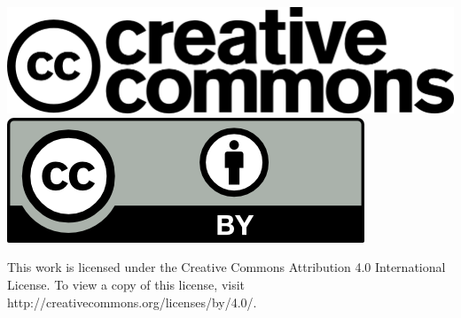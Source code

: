 \documentclass[12pt]{beamer}
\begin{document}
{
\begin{frame}
\includegraphics[scale=0.8]{../reusable_images/cc_logo_arge.png}\hspace{0.5cm} 
\includegraphics[scale=0.95]{../reusable_images/by.png}

\vspace{1cm}
This work is licensed under the Creative Commons Attribution 4.0 International License. To view a copy of this license, visit http://creativecommons.org/licenses/by/4.0/.
\end{frame}
}
\end{document}
